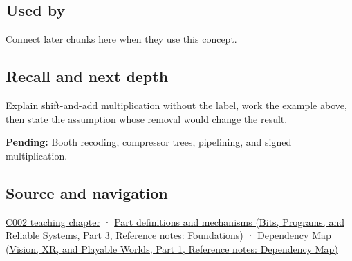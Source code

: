 \subsection{Used by}\label{appendix-a65290d66ed9-used-by}

\hypertarget{appendix-a65290d66ed9-used-by}{}

Connect later chunks here when they use this concept.

\subsection{Recall and next depth}\label{appendix-a65290d66ed9-recall-and-next-depth}

\hypertarget{appendix-a65290d66ed9-recall-and-next-depth}{}

Explain shift-and-add multiplication without the label, work the example above, then state the assumption whose removal would change the result.

\textbf{Pending:} Booth recoding, compressor trees, pipelining, and signed multiplication.

\subsection{Source and navigation}\label{appendix-a65290d66ed9-source-and-navigation}

\hypertarget{appendix-a65290d66ed9-source-and-navigation}{}

\hyperref[01-foundations-i-ch001-arithmetic-becomes-a-policy]{C002 teaching chapter} · \href{../01-Bits-Programs-and-Reliable-Systems-P03/main.pdf\#nameddest=appendix-fd090d982a15}{Part definitions and mechanisms (Bits, Programs, and Reliable Systems, Part 3, Reference notes: Foundations)} · \href{../07-Vision-XR-and-Playable-Worlds-P01/main.pdf\#nameddest=appendix-4ad47bdd269a}{Dependency Map (Vision, XR, and Playable Worlds, Part 1, Reference notes: Dependency Map)}
